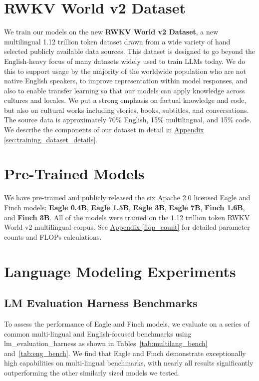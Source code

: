 \section{RWKV World v2 Dataset}\label{sec:dataset}

We train our models on the new \textbf{RWKV World v2 Dataset}, a new multilingual 1.12 trillion token dataset drawn from a wide variety of hand selected publicly available data sources. This dataset is designed to go beyond the English-heavy focus of many datasets widely used to train LLMs today. We do this to support usage by the majority of the worldwide population who are not native English speakers, to improve representation within model responses, and also to enable transfer learning so that our models can apply knowledge across cultures and locales. We put a strong emphasis on factual knowledge and code, but also on cultural works including stories, books, subtitles, and conversations. The source data is approximately 70\% English, 15\% multilingual, and 15\% code. We describe the components of our dataset in detail in
\hyperref[sec:training_dataset_details]{Appendix \ref*{sec:training_dataset_details}}.

\section{Pre-Trained Models}
\label{sec:pretrained_models}

We have pre-trained and publicly released the six Apache 2.0 licensed Eagle and Finch models: \textbf{Eagle 0.4B}, \textbf{Eagle 1.5B}, \textbf{Eagle 3B}, \textbf{Eagle 7B}, \textbf{Finch 1.6B}, and \textbf{Finch 3B}. All of the models were trained on the 1.12 trillion token RWKV World v2 multilingual corpus. See \hyperref[flop_count]{Appendix \ref*{flop_count}} for detailed parameter counts and FLOPs calculations.

\section{Language Modeling Experiments}\label{evaluations}

\subsection{LM Evaluation Harness Benchmarks}\label{subsec:evals}

To assess the performance of Eagle and Finch models, we evaluate on a series of common multi-lingual and English-focused benchmarks using lm\_evaluation\_harness \citep{gao10256836framework} as shown in Tables~\ref{tab:multilang_bench} and~\ref{tab:eng_bench}. We find that Eagle and Finch demonstrate exceptionally high capabilities on multi-lingual benchmarks, with nearly all results significantly outperforming the other similarly sized models we tested.

